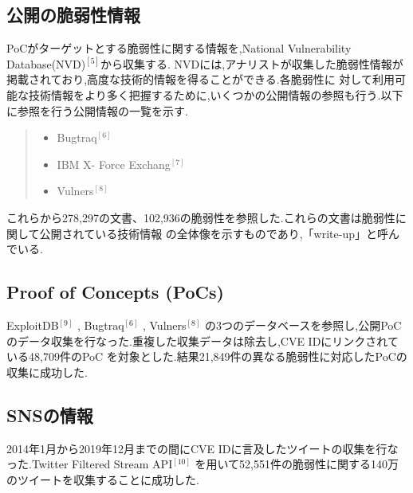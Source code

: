 \documentclass[submit,techreq,noauthor]{eco}	%
\begin{document}
\subsection*{公開の脆弱性情報}
PoCがターゲットとする脆弱性に関する情報を,National Vulnerability Database(NVD)\begin{math}^{[5]}\end{math}から収集する.
NVDには,アナリストが収集した脆弱性情報が掲載されており,高度な技術的情報を得ることができる.各脆弱性に
対して利用可能な技術情報をより多く把握するために,いくつかの公開情報の参照も行う.以下に参照を行う公開情報の一覧を示す.
\begin{quote}
  \begin{itemize}
   \item Bugtraq\begin{math}^{[6]}\end{math}
   \item IBM X- Force Exchang\begin{math}^{[7]}\end{math}
   \item Vulners\begin{math}^{[8]}\end{math}
  \end{itemize}
\end{quote}
これらから278,297の文書、102,936の脆弱性を参照した.これらの文書は脆弱性に関して公開されている技術情報
の全体像を示すものであり,「write-up」と呼んでいる.

\subsection*{Proof of Concepts (PoCs)}
ExploitDB\begin{math}^{[9]}\end{math} ,  Bugtraq\begin{math}^{[6]}\end{math} ,  Vulners\begin{math}^{[8]}\end{math}
の3つのデータベースを参照し,公開PoCのデータ収集を行なった.重複した収集データは除去し,CVE IDにリンクされている48,709件のPoC
を対象とした.結果21,849件の異なる脆弱性に対応したPoCの収集に成功した.

\subsection*{SNSの情報}
2014年1月から2019年12月までの間にCVE IDに言及したツイートの収集を行なった.Twitter Filtered Stream API\begin{math}^{[10]}\end{math}
を用いて52,551件の脆弱性に関する140万のツイートを収集することに成功した.
\end{document}
